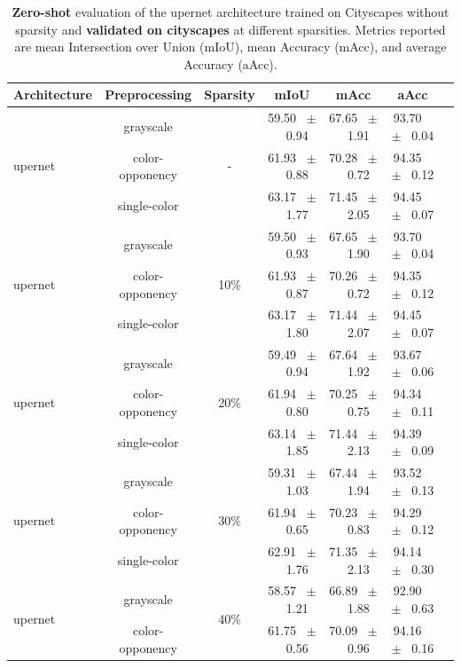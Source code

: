\begin{table}[h]
  \centering
  \caption{\textbf{Zero-shot} evaluation of the upernet architecture trained on Cityscapes without sparsity and \textbf{validated on cityscapes} at different sparsities. Metrics reported are mean Intersection over Union (mIoU), mean Accuracy (mAcc), and average Accuracy (aAcc).}
  \begin{tabular}{@{}lccc ccc@{}}
    \toprule
    Architecture & Preprocessing & Sparsity & mIoU & mAcc & aAcc \\
    \midrule
    \multirow{3}{*}{upernet} & grayscale & \multirow{3}{*}{-} & 59.50 ~$\pm$~ 0.94 & 67.65 ~$\pm$~ 1.91 & 93.70 ~$\pm$~ 0.04 \\
    & color-opponency &  & 61.93 ~$\pm$~ 0.88 & 70.28 ~$\pm$~ 0.72 & 94.35 ~$\pm$~ 0.12 \\
    & single-color &  & 63.17 ~$\pm$~ 1.77 & 71.45 ~$\pm$~ 2.05 & 94.45 ~$\pm$~ 0.07 \\
    \midrule
    \multirow{3}{*}{upernet} & grayscale & \multirow{3}{*}{10\%} & 59.50 ~$\pm$~ 0.93 & 67.65 ~$\pm$~ 1.90 & 93.70 ~$\pm$~ 0.04 \\
    & color-opponency &  & 61.93 ~$\pm$~ 0.87 & 70.26 ~$\pm$~ 0.72 & 94.35 ~$\pm$~ 0.12 \\
    & single-color &  & 63.17 ~$\pm$~ 1.80 & 71.44 ~$\pm$~ 2.07 & 94.45 ~$\pm$~ 0.07 \\
    \midrule
    \multirow{3}{*}{upernet} & grayscale & \multirow{3}{*}{20\%} & 59.49 ~$\pm$~ 0.94 & 67.64 ~$\pm$~ 1.92 & 93.67 ~$\pm$~ 0.06 \\
    & color-opponency &  & 61.94 ~$\pm$~ 0.80 & 70.25 ~$\pm$~ 0.75 & 94.34 ~$\pm$~ 0.11 \\
    & single-color &  & 63.14 ~$\pm$~ 1.85 & 71.44 ~$\pm$~ 2.13 & 94.39 ~$\pm$~ 0.09 \\
    \midrule
    \multirow{3}{*}{upernet} & grayscale & \multirow{3}{*}{30\%} & 59.31 ~$\pm$~ 1.03 & 67.44 ~$\pm$~ 1.94 & 93.52 ~$\pm$~ 0.13 \\
    & color-opponency &  & 61.94 ~$\pm$~ 0.65 & 70.23 ~$\pm$~ 0.83 & 94.29 ~$\pm$~ 0.12 \\
    & single-color &  & 62.91 ~$\pm$~ 1.76 & 71.35 ~$\pm$~ 2.13 & 94.14 ~$\pm$~ 0.30 \\
    \midrule
    \multirow{3}{*}{upernet} & grayscale & \multirow{3}{*}{40\%} & 58.57 ~$\pm$~ 1.21 & 66.89 ~$\pm$~ 1.88 & 92.90 ~$\pm$~ 0.63 \\
    & color-opponency &  & 61.75 ~$\pm$~ 0.56 & 70.09 ~$\pm$~ 0.96 & 94.16 ~$\pm$~ 0.16 \\

\end{tabular}
\end{table}
